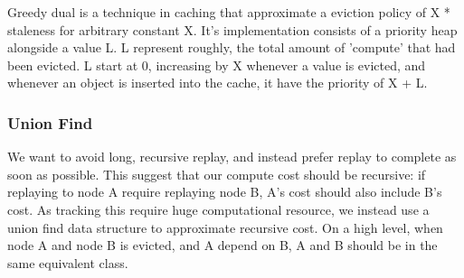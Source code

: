 Greedy dual is a technique in caching that approximate a eviction policy of X * staleness for arbitrary constant X.
It's implementation consists of a priority heap alongside a value L.
L represent roughly, the total amount of 'compute' that had been evicted.
L start at 0, increasing by X whenever a value is evicted, and whenever an object is inserted into the cache, it have the priority of X + L.
\subsubsection{Union Find}
We want to avoid long, recursive replay, and instead prefer replay to complete as soon as possible. This suggest that our compute cost should be recursive: if replaying to node A require replaying node B, A's cost should also include B's cost. As tracking this require huge computational resource, we instead use a union find data structure to approximate recursive cost. On a high level, when node A and node B is evicted, and A depend on B, A and B should be in the same equivalent class.
